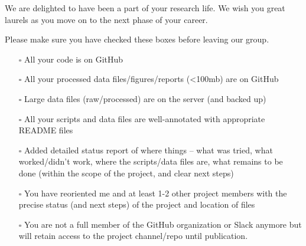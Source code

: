 \documentclass[
  letterpaper,
  DIV=11,
  numbers=noendperiod]{scrreprt}
\begin{document}
We are delighted to have been a part of your research life. We wish you
great laurels as you move on to the next phase of your career.

Please make sure you have checked these boxes before leaving our group.

\begin{itemize}
\item[$\square$]
  All your code is on GitHub
\item[$\square$]
  All your processed data files/figures/reports (\textless100mb) are on
  GitHub
\item[$\square$]
  Large data files (raw/processed) are on the server (and backed up)
\item[$\square$]
  All your scripts and data files are well-annotated with appropriate
  README files
\item[$\square$]
  Added detailed status report of where things -- what was tried, what
  worked/didn't work, where the scripts/data files are, what remains to
  be done (within the scope of the project, and clear next steps)
\item[$\square$]
  You have reoriented me and at least 1-2 other project members with the
  precise status (and next steps) of the project and location of files
\item[$\square$]
  You are not a full member of the GitHub organization or Slack anymore
  but will retain access to the project channel/repo until publication.
\end{itemize}
\end{document}
